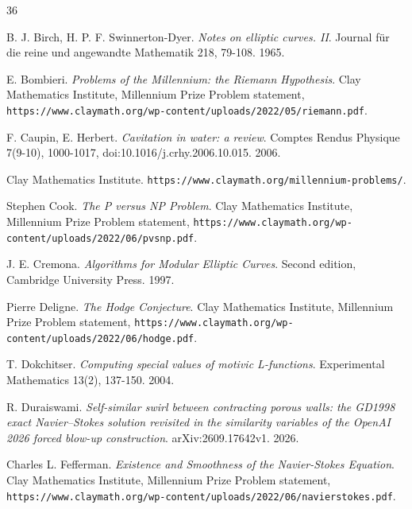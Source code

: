 \backmatter
{}
\begin{thebibliography}{36}

B. J. Birch, H. P. F. Swinnerton-Dyer. \emph{Notes on elliptic curves. II}. Journal f\"ur die reine und angewandte Mathematik 218, 79-108. 1965.

E. Bombieri. \emph{Problems of the Millennium: the Riemann Hypothesis}. Clay Mathematics Institute, Millennium Prize Problem statement, \texttt{https:/\allowbreak{}/\allowbreak{}www.claymath.org/\allowbreak{}wp-content/\allowbreak{}uploads/\allowbreak{}2022/\allowbreak{}05/\allowbreak{}riemann.pdf}.

F. Caupin, E. Herbert. \emph{Cavitation in water: a review}. Comptes Rendus Physique 7(9-10), 1000-1017, doi:10.1016/j.crhy.2006.10.015. 2006.

Clay Mathematics Institute. \texttt{https:/\allowbreak{}/\allowbreak{}www.claymath.org/\allowbreak{}millennium-problems/\allowbreak{}}.

Stephen Cook. \emph{The P versus NP Problem}. Clay Mathematics Institute, Millennium Prize Problem statement, \texttt{https:/\allowbreak{}/\allowbreak{}www.claymath.org/\allowbreak{}wp-content/\allowbreak{}uploads/\allowbreak{}2022/\allowbreak{}06/\allowbreak{}pvsnp.pdf}.

J. E. Cremona. \emph{Algorithms for Modular Elliptic Curves}. Second edition, Cambridge University Press. 1997.

Pierre Deligne. \emph{The Hodge Conjecture}. Clay Mathematics Institute, Millennium Prize Problem statement, \texttt{https:/\allowbreak{}/\allowbreak{}www.claymath.org/\allowbreak{}wp-content/\allowbreak{}uploads/\allowbreak{}2022/\allowbreak{}06/\allowbreak{}hodge.pdf}.

T. Dokchitser. \emph{Computing special values of motivic L-functions}. Experimental Mathematics 13(2), 137-150. 2004.

R. Duraiswami. \emph{Self-similar swirl between contracting porous walls: the GD1998 exact Navier--Stokes solution revisited in the similarity variables of the OpenAI 2026 forced blow-up construction}. arXiv:2609.17642v1. 2026.

Charles L. Fefferman. \emph{Existence and Smoothness of the Navier-Stokes Equation}. Clay Mathematics Institute, Millennium Prize Problem statement, \texttt{https:/\allowbreak{}/\allowbreak{}www.claymath.org/\allowbreak{}wp-content/\allowbreak{}uploads/\allowbreak{}2022/\allowbreak{}06/\allowbreak{}navierstokes.pdf}.


\end{thebibliography}
